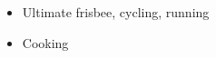 %
%
%

\renewcommand{\arraystretch}{1.1}
\begin{itemize}
    \item Ultimate frisbee, cycling, running
    \item Cooking
\end{itemize}

	